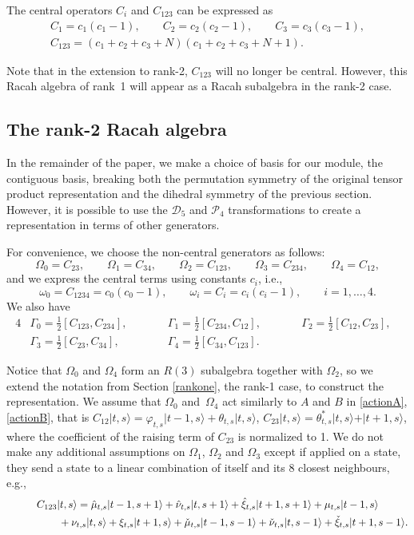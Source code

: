 \documentclass[pdftex]{sigma}
\numberwithin{equation}{section}
\begin{document}
The central operators $C_i$ and $C_{123}$ can be expressed as
\begin{gather*}
  C_1=c_1(c_1-1),\qquad C_2=c_2(c_2-1),\qquad C_3=c_3(c_3-1),\\
  C_{123}=(c_1+c_2+c_3+N)(c_1+c_2+c_3+N+1).
\end{gather*}


Note that in the extension to rank-2, $C_{123}$ will no longer be central. However, this Racah algebra of rank~1 will appear as a Racah subalgebra in the rank-2 case.

\subsection{The rank-2 Racah algebra}

In the remainder of the paper, we make a choice of basis for our module, the contiguous basis, breaking both the permutation symmetry of the original tensor product representation and the dihedral symmetry of the previous section. However, it is possible to use the $\mathcal{D}_5$ and $\mathcal{P}_4$ transformations to create a representation in terms of other generators.

For convenience, we choose the non-central generators as follows:
\[ \Omega_0 = C_{23}, \qquad \Omega_1=C_{34}, \qquad \Omega_2=C_{123}, \qquad \Omega_3=C_{234}, \qquad \Omega_4=C_{12},\]
and we express the central terms using constants $c_i$, i.e.,
\[
\omega_0=C_{1234}=c_0(c_0-1),\qquad \omega_i=C_i=c_i(c_i-1),\qquad i=1,\dots,4.
\]
We also have
\begin{alignat*}{4}
   &\Gamma_0=\tfrac{1}{2}[C_{123},C_{234}],\qquad && \Gamma_1=\tfrac{1}{2}[C_{234},C_{12}],\qquad &&\Gamma_2=\tfrac{1}{2}[C_{12},C_{23}],&\\
  & \Gamma_3=\tfrac{1}{2}[C_{23},C_{34}],\qquad &&\Gamma_4=\tfrac{1}{2}[C_{34},C_{123}].&&&
\end{alignat*}

Notice that $\Omega_0$ and $\Omega_4$ form an $R(3)$ subalgebra together with $\Omega_2$, so we extend the notation from Section \ref{rankone}, the rank-1 case, to construct the representation. We assume that $\Omega_0$ and~$\Omega_4$ act similarly to $A$ and $B$ in \eqref{actionA}, \eqref{actionB}, that is
$
C_{12}\vert t,s\rangle=\varphi_{t,s}\vert t-1,s\rangle+\theta_{t,s}\vert t,s\rangle$, $ C_{23}\vert t,s\rangle=\theta^*_{t,s}\vert t,s\rangle+\vert t+1,s\rangle$,
where the coefficient of the raising term of $C_{23}$ is normalized to 1. We do not make any additional assumptions on $\Omega_1$, $\Omega_2$ and $\Omega_3$ except if applied on a state, they send a state to a linear combination of itself and its 8 closest neighbours, e.g.,
\begin{gather*}
C_{123}\vert t,s\rangle = \hat{\mu}_{t,s}\vert t-1,s+1\rangle+\hat{\nu}_{t,s}\vert t,s+1\rangle+\hat{\xi}_{t,s}\vert t+1,s+1\rangle+\mu_{t,s}\vert t-1,s\rangle\\
\hphantom{C_{123}\vert t,s\rangle =}{}
+\nu_{t,s}\vert t,s\rangle+\xi_{t,s}\vert t+1,s\rangle+\check{\mu}_{t,s}\vert t-1,s-1\rangle+\check{\nu}_{t,s}\vert t,s-1\rangle+\check{\xi}_{t,s}\vert t+1,s-1\rangle.
\end{gather*}
\end{document}
